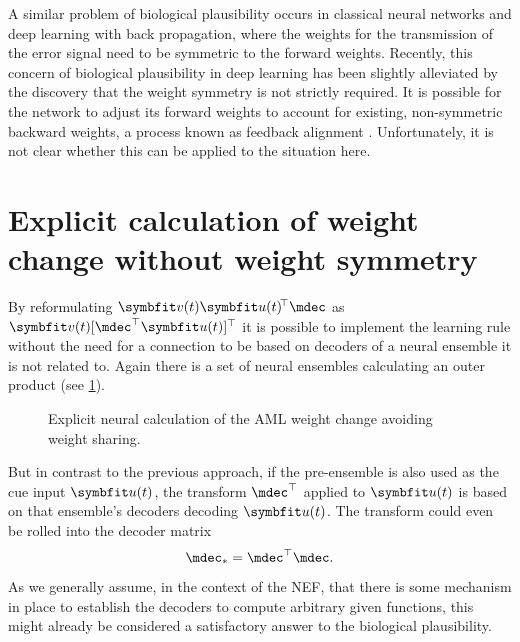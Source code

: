 A similar problem of biological plausibility occurs in classical neural networks and deep learning with back propagation, where the weights for the transmission of the error signal need to be symmetric to the forward weights.
Recently, this concern of biological plausibility in deep learning has been slightly alleviated by the discovery that the weight symmetry is not strictly required.
It is possible for the network to adjust its forward weights to account for existing, non-symmetric backward weights, a process known as feedback alignment \parencite{lillicrap2016}.
Unfortunately, it is not clear whether this can be applied to the situation here.


\section{Explicit calculation of weight change without weight symmetry}
By reformulating $\vc v(t) \vc u(t)\!\Tr \mdec$ as $\vc v(t)[\mdec\Tr \vc u(t)]\Tr$ it is possible to implement the learning rule without the need for a connection to be based on decoders of a neural ensemble it is not related to.
Again there is a set of neural ensembles calculating an outer product (see \cref{fig:aml-explicit-no-sym}).
\begin{figure}
    \centering
    \caption{Explicit neural calculation of the AML weight change avoiding weight sharing.}\label{fig:aml-explicit-no-sym}
\end{figure}
But in contrast to the previous approach, if the pre-ensemble is also used as the cue input $\vc u(t)$, the transform $\mdec\Tr$ applied to $\vc u(t)$ is based on that ensemble's decoders decoding $\vc u(t)$.
The transform could even be rolled into the decoder matrix
\begin{equation}
    \mdec_{*} = \mdec\Tr \mdec \text{.}
\end{equation}
As we generally assume, in the context of the NEF, that there is some mechanism in place to establish the decoders to compute arbitrary given functions, this might already be considered a satisfactory answer to the biological plausibility.

